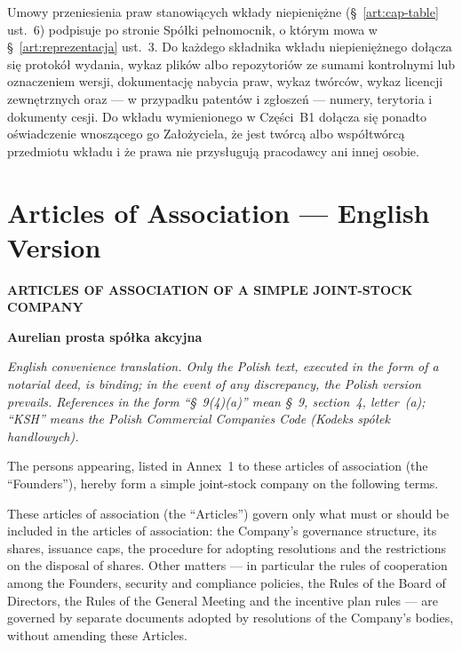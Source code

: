 \documentclass[12pt,a4paper]{report}
\newcounter{paragraf}
\newcommand{\CompanyFull}{Aurelian prosta spółka akcyjna}
\begin{document}
Umowy przeniesienia praw stanowiących wkłady niepieniężne (§~\ref{art:cap-table} ust.~6) podpisuje po stronie Spółki pełnomocnik, o którym mowa w §~\ref{art:reprezentacja} ust.~3. Do każdego składnika wkładu niepieniężnego dołącza się protokół wydania, wykaz plików albo repozytoriów ze sumami kontrolnymi lub oznaczeniem wersji, dokumentację nabycia praw, wykaz twórców, wykaz licencji zewnętrznych oraz --- w przypadku patentów i zgłoszeń --- numery, terytoria i dokumenty cesji. Do wkładu wymienionego w Części~B1 dołącza się ponadto oświadczenie wnoszącego go Założyciela, że jest twórcą albo współtwórcą przedmiotu wkładu i że prawa nie przysługują pracodawcy ani innej osobie.

\newpage
{}
\setcounter{paragraf}{0}

\chapter*{Articles of Association --- English Version}

\begin{center}
{\Large\bfseries ARTICLES OF ASSOCIATION OF A SIMPLE JOINT-STOCK COMPANY}\par
\vspace{0.25cm}
{\LARGE\bfseries \CompanyFull}\par
\vspace{0.6cm}
\end{center}

\begin{center}
\small\itshape English convenience translation. Only the Polish text, executed in the form of a notarial deed, is binding; in the event of any discrepancy, the Polish version prevails. References in the form ``\S~9(4)(a)'' mean \S~9, section~4, letter~(a); ``KSH'' means the Polish Commercial Companies Code (\textit{Kodeks spółek handlowych}).
\end{center}

The persons appearing, listed in Annex~1 to these articles of association (the ``Founders''), hereby form a simple joint-stock company on the following terms.

These articles of association (the ``Articles'') govern only what must or should be included in the articles of association: the Company's governance structure, its shares, issuance caps, the procedure for adopting resolutions and the restrictions on the disposal of shares. Other matters --- in particular the rules of cooperation among the Founders, security and compliance policies, the Rules of the Board of Directors, the Rules of the General Meeting and the incentive plan rules --- are governed by separate documents adopted by resolutions of the Company's bodies, without amending these Articles.
\end{document}
